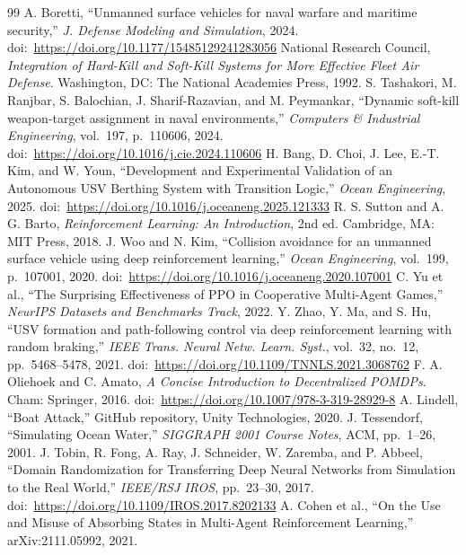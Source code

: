 \documentclass[9pt,twocolumn,a4paper]{extarticle}
\providecommand{\doi}[1]{doi:~\url{#1}}
\begin{document}
{\fontsize{9}{13.5}\selectfont
\begin{thebibliography}{99}
 A. Boretti, ``Unmanned surface vehicles for naval warfare and maritime security,'' \textit{J. Defense Modeling and Simulation}, 2024. \doi{https://doi.org/10.1177/15485129241283056}
 National Research Council, \textit{Integration of Hard-Kill and Soft-Kill Systems for More Effective Fleet Air Defense}. Washington, DC: The National Academies Press, 1992.
 S. Tashakori, M. Ranjbar, S. Balochian, J. Sharif-Razavian, and M. Peymankar, ``Dynamic soft-kill weapon-target assignment in naval environments,'' \textit{Computers \& Industrial Engineering}, vol.~197, p.~110606, 2024. \doi{https://doi.org/10.1016/j.cie.2024.110606}
 H. Bang, D. Choi, J. Lee, E.-T. Kim, and W. Youn, ``Development and Experimental Validation of an Autonomous USV Berthing System with Transition Logic,'' \textit{Ocean Engineering}, 2025. \doi{https://doi.org/10.1016/j.oceaneng.2025.121333}
 R. S. Sutton and A. G. Barto, \textit{Reinforcement Learning: An Introduction}, 2nd ed. Cambridge, MA: MIT Press, 2018.
 J. Woo and N. Kim, ``Collision avoidance for an unmanned surface vehicle using deep reinforcement learning,'' \textit{Ocean Engineering}, vol.~199, p.~107001, 2020. \doi{https://doi.org/10.1016/j.oceaneng.2020.107001}
 C. Yu et al., ``The Surprising Effectiveness of PPO in Cooperative Multi-Agent Games,'' \textit{NeurIPS Datasets and Benchmarks Track}, 2022.
 Y. Zhao, Y. Ma, and S. Hu, ``USV formation and path-following control via deep reinforcement learning with random braking,'' \textit{IEEE Trans. Neural Netw. Learn. Syst.}, vol.~32, no.~12, pp.~5468--5478, 2021. \doi{https://doi.org/10.1109/TNNLS.2021.3068762}
 F. A. Oliehoek and C. Amato, \textit{A Concise Introduction to Decentralized POMDPs}. Cham: Springer, 2016. \doi{https://doi.org/10.1007/978-3-319-28929-8}
 A. Lindell, ``Boat Attack,'' GitHub repository, Unity Technologies, 2020.
 J. Tessendorf, ``Simulating Ocean Water,'' \textit{SIGGRAPH 2001 Course Notes}, ACM, pp.~1--26, 2001.
 J. Tobin, R. Fong, A. Ray, J. Schneider, W. Zaremba, and P. Abbeel, ``Domain Randomization for Transferring Deep Neural Networks from Simulation to the Real World,'' \textit{IEEE/RSJ IROS}, pp.~23--30, 2017. \doi{https://doi.org/10.1109/IROS.2017.8202133}
 A. Cohen et al., ``On the Use and Misuse of Absorbing States in Multi-Agent Reinforcement Learning,'' arXiv:2111.05992, 2021.

\end{thebibliography}}
\end{document}
